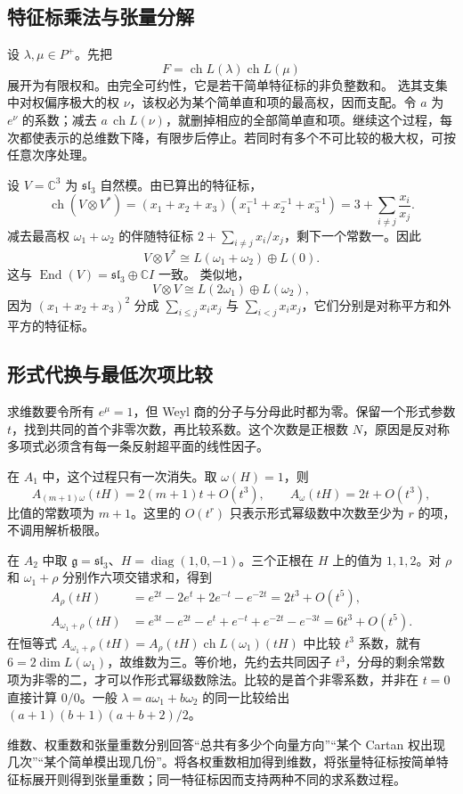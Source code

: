 \subsection{特征标乘法与张量分解}
\label{b5:subsec:1905:03}

设 \(\lambda,\mu\in P^+\)。先把
\[
	F=\operatorname{ch}L(\lambda)\operatorname{ch}L(\mu)
\]
展开为有限权和。由完全可约性，它是若干简单特征标的非负整数和。 选其支集中对权偏序极大的权 \(\nu\)，该权必为某个简单直和项的最高权，因而支配。令 \(a\) 为 \(e^\nu\) 的系数；减去 \(a\,\operatorname{ch}L(\nu)\)，就删掉相应的全部简单直和项。继续这个过程，每次都使表示的总维数下降，有限步后停止。若同时有多个不可比较的极大权，可按任意次序处理。

\begin{example}\label{b5:exm:sl3-natural-dual-tensor}
	设 \(V=\mathbb C^3\) 为 \(\mathfrak{sl}_3\) 自然模。由已算出的特征标，
	\[
		\operatorname{ch}(V\otimes V^*) =(x_1+x_2+x_3)(x_1^{-1}+x_2^{-1}+x_3^{-1}) =3+\sum_{i\ne j}\frac{x_i}{x_j}.
	\]
	减去最高权 \(\omega_1+\omega_2\) 的伴随特征标 \(2+\sum_{i\ne j}x_i/x_j\)，剩下一个常数一。因此
	\[
		V\otimes V^*\cong L(\omega_1+\omega_2)\oplus L(0).
	\]
	这与 \(\operatorname{End}(V)=\mathfrak{sl}_3\oplus\mathbb CI\) 一致。 类似地，
	\[
		V\otimes V\cong L(2\omega_1)\oplus L(\omega_2),
	\]
	因为 \((x_1+x_2+x_3)^2\) 分成 \(\sum_{i\le j}x_ix_j\) 与 \(\sum_{i<j}x_ix_j\)，它们分别是对称平方和外平方的特征标。
\end{example}

\subsection{形式代换与最低次项比较}
\label{b5:subsec:1905:04}

求维数要令所有 \(e^\mu=1\)，但 Weyl 商的分子与分母此时都为零。保留一个形式参数 \(t\)，找到共同的首个非零次数，再比较系数。这个次数是正根数 \(N\)，原因是反对称多项式必须含有每一条反射超平面的线性因子。

\ProseParagraphBreak
在 \(A_1\) 中，这个过程只有一次消失。取 \(\omega(H)=1\)，则
\[
	A_{(m+1)\omega}(tH)=2(m+1)t+O(t^3),\qquad A_\omega(tH)=2t+O(t^3),
\]
比值的常数项为 \(m+1\)。这里的 \(O(t^r)\) 只表示形式幂级数中次数至少为 \(r\) 的项，不调用解析极限。

\ProseParagraphBreak
在 \(A_2\) 中取 \(\mathfrak g=\mathfrak{sl}_3\)、\(H=\operatorname{diag}(1,0,-1)\)。三个正根在 \(H\) 上的值为 \(1,1,2\)。对 \(\rho\) 和 \(\omega_1+\rho\) 分别作六项交错求和，得到
\[
	\begin{aligned}
		A_\rho(tH) &=e^{2t}-2e^t+2e^{-t}-e^{-2t} =2t^3+O(t^5),\\
		A_{\omega_1+\rho}(tH) &=e^{3t}-e^{2t}-e^t+e^{-t}+e^{-2t}-e^{-3t} =6t^3+O(t^5).
	\end{aligned}
\]
在恒等式 \(A_{\omega_1+\rho}(tH)=A_\rho(tH)\operatorname{ch}L(\omega_1)(tH)\) 中比较 \(t^3\) 系数，就有 \(6=2\dim L(\omega_1)\)，故维数为三。等价地，先约去共同因子 \(t^3\)，分母的剩余常数项为非零的二，才可以作形式幂级数除法。比较的是首个非零系数，并非在 \(t=0\) 直接计算 \(0/0\)。一般 \(\lambda=a\omega_1+b\omega_2\) 的同一比较给出 \((a+1)(b+1)(a+b+2)/2\)。

\ProseParagraphBreak
维数、权重数和张量重数分别回答“总共有多少个向量方向”“某个 Cartan 权出现几次”“某个简单模出现几份”。将各权重数相加得到维数，将张量特征标按简单特征标展开则得到张量重数；同一特征标因而支持两种不同的求系数过程。
